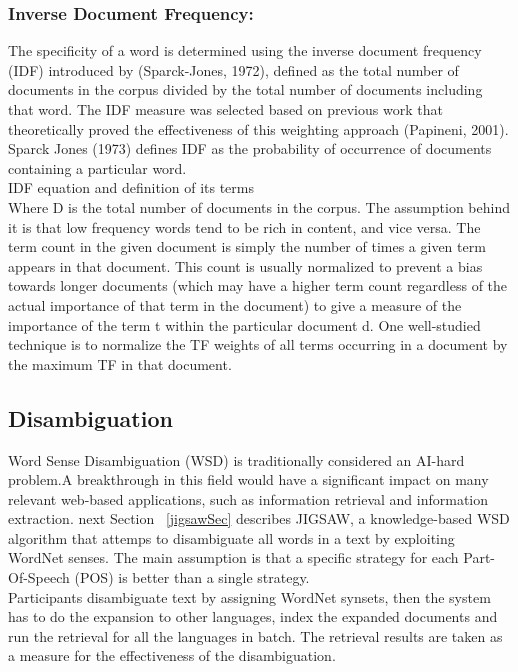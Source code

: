 \subsubsection{Inverse Document Frequency:}
The specificity of a word is determined using the inverse document frequency (IDF) introduced by (Sparck-Jones, 1972), defined as the total number of documents in the corpus divided by the total number of documents including that word. The IDF measure was selected based on previous work that theoretically proved the effectiveness of this weighting approach (Papineni, 2001). Sparck Jones (1973) defines IDF as the probability of occurrence of documents containing a particular word.\\
IDF equation and definition of its terms\\
Where D is the total number of documents in the corpus. The assumption behind it is that low frequency words tend to be rich in content, and vice versa.
The term count in the given document is simply the number of times a given term appears in that document. This count is usually normalized to prevent a bias towards longer documents (which may have a higher term count regardless of the actual importance of that term in the document) to give a measure of the importance of the term t within the particular document d. One well-studied technique is to normalize the TF weights of all terms occurring in a document by the maximum TF in that document\citep{tfidf_1}.\\
\subsection{Disambiguation}                                            
Word Sense Disambiguation (WSD) is traditionally considered an AI-hard problem.A breakthrough in this field would have a significant impact on many relevant web-based applications, such as information retrieval and information extraction. next Section ~\ref{jigsawSec} describes JIGSAW, a knowledge-based  WSD algorithm that attemps to disambiguate all words in a text by exploiting WordNet senses. The main assumption is that a specific strategy for each Part-Of-Speech (POS)  is better than a single strategy.\\
Participants disambiguate text by assigning WordNet synsets, then the  system has to do the expansion to other languages, index the expanded documents and run the retrieval for all the languages in batch. The retrieval results are taken as a measure for the effectiveness of the disambiguation.

